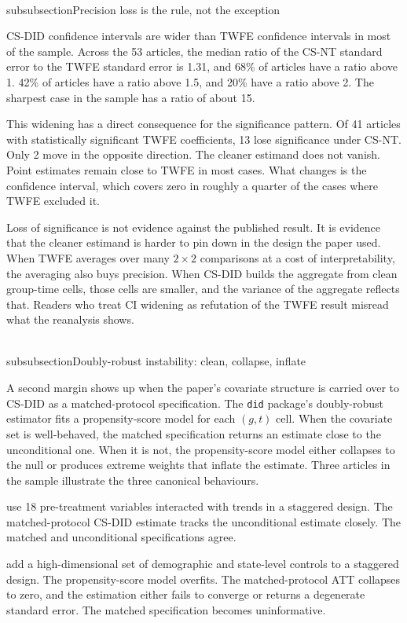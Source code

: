 \documentclass[11pt]{article}
\begin{document}
\\subsubsection{Precision loss is the rule, not the exception}

CS-DID confidence intervals are wider than TWFE confidence intervals in most of the sample. Across the 53 articles, the median ratio of the CS-NT standard error to the TWFE standard error is 1.31, and 68\% of articles have a ratio above 1. 42\% of articles have a ratio above 1.5, and 20\% have a ratio above 2. The sharpest case in the sample has a ratio of about 15.

This widening has a direct consequence for the significance pattern. Of 41 articles with statistically significant TWFE coefficients, 13 lose significance under CS-NT. Only 2 move in the opposite direction. The cleaner estimand does not vanish. Point estimates remain close to TWFE in most cases. What changes is the confidence interval, which covers zero in roughly a quarter of the cases where TWFE excluded it.

Loss of significance is not evidence against the published result. It is evidence that the cleaner estimand is harder to pin down in the design the paper used. When TWFE averages over many $2\times2$ comparisons at a cost of interpretability, the averaging also buys precision. When CS-DID builds the aggregate from clean group-time cells, those cells are smaller, and the variance of the aggregate reflects that. Readers who treat CI widening as refutation of the TWFE result misread what the reanalysis shows.

\\subsubsection{Doubly-robust instability: clean, collapse, inflate}

A second margin shows up when the paper's covariate structure is carried over to CS-DID as a matched-protocol specification. The \texttt{did} package's doubly-robust estimator fits a propensity-score model for each $(g,t)$ cell. When the covariate set is well-behaved, the matched specification returns an estimate close to the unconditional one. When it is not, the propensity-score model either collapses to the null or produces extreme weights that inflate the estimate. Three articles in the sample illustrate the three canonical behaviours.

\textcite{carrillo2019provider} use 18 pre-treatment variables interacted with trends in a staggered design. The matched-protocol CS-DID estimate tracks the unconditional estimate closely. The matched and unconditional specifications agree.

\textcite{carpenter2019direct} add a high-dimensional set of demographic and state-level controls to a staggered design. The propensity-score model overfits. The matched-protocol ATT collapses to zero, and the estimation either fails to converge or returns a degenerate standard error. The matched specification becomes uninformative.
\end{document}
